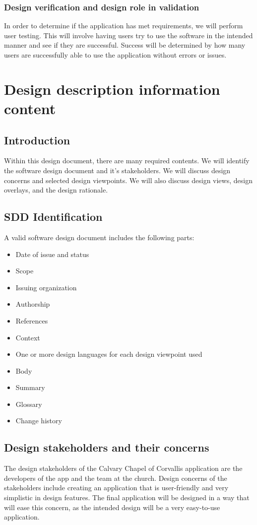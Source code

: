 \documentclass[letterpaper,10pt,draftclsnofoot,onecolumn,titlepage]{IEEEtran}
\begin{document}
			\subsubsection{Design verification and design role in validation}
				In order to determine if the application has met requirements, we will perform user testing. 
				This will involve having users try to use the software in the intended manner and see if they are successful. 
				Success will be determined by how many users are successfully able to use the application without errors or issues. 
	
	\section{Design description information content}
	
		\subsection{Introduction}
			Within this design document, there are many required contents. 
			We will identify the software design document and it's stakeholders. 
			We will discuss design concerns and selected design viewpoints. 
			We will also discuss design views, design overlays, and the design rationale. 
		
		\subsection{SDD Identification}
			A valid software design document includes the following parts: 
			\begin{itemize}
				\item{Date of issue and status}
				\item{Scope}
				\item{Issuing organization}
				\item{Authorship}
				\item{References}
				\item{Context}
				\item{One or more design languages for each design viewpoint used}
				\item{Body}
				\item{Summary}
				\item{Glossary}
				\item{Change history}
			\end{itemize}
	
		\subsection{Design stakeholders and their concerns}
			The design stakeholders of the Calvary Chapel of Corvallis application are the developers of the app and the team at the church. 
			Design concerns of the stakeholders include creating an application that is user-friendly and very simplistic in design features.  
			The final application will be designed in a way that will ease this concern, as the intended design will be a very easy-to-use application. 
		
\end{document}
